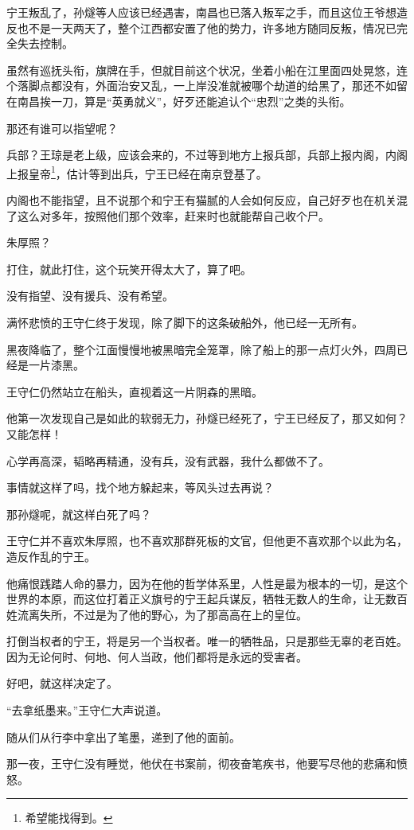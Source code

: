 \begin{multicols}{\theparacolNo}
		宁王叛乱了，孙燧等人应该已经遇害，南昌也已落入叛军之手，而且这位王爷想造反也不是一天两天了，整个江西都安置了他的势力，许多地方随同反叛，情况已完全失去控制。

		虽然有巡抚头衔，旗牌在手，但就目前这个状况，坐着小船在江里面四处晃悠，连个落脚点都没有，外面治安又乱，一上岸没准就被哪个劫道的给黑了，那还不如留在南昌挨一刀，算是“英勇就义”，好歹还能追认个“忠烈”之类的头衔。

		那还有谁可以指望呢？

		兵部？王琼是老上级，应该会来的，不过等到地方上报兵部，兵部上报内阁，内阁上报皇帝\footnote{希望能找得到。}，估计等到出兵，宁王已经在南京登基了。

		内阁也不能指望，且不说那个和宁王有猫腻的人会如何反应，自己好歹也在机关混了这么对多年，按照他们那个效率，赶来时也就能帮自己收个尸。

		朱厚照？

		打住，就此打住，这个玩笑开得太大了，算了吧。

		没有指望、没有援兵、没有希望。

		满怀悲愤的王守仁终于发现，除了脚下的这条破船外，他已经一无所有。

		黑夜降临了，整个江面慢慢地被黑暗完全笼罩，除了船上的那一点灯火外，四周已经是一片漆黑。

		王守仁仍然站立在船头，直视着这一片阴森的黑暗。

		他第一次发现自己是如此的软弱无力，孙燧已经死了，宁王已经反了，那又如何？又能怎样！

		心学再高深，韬略再精通，没有兵，没有武器，我什么都做不了。

		事情就这样了吗，找个地方躲起来，等风头过去再说？

		那孙燧呢，就这样白死了吗？

		王守仁并不喜欢朱厚照，也不喜欢那群死板的文官，但他更不喜欢那个以此为名，造反作乱的宁王。

		他痛恨践踏人命的暴力，因为在他的哲学体系里，人性是最为根本的一切，是这个世界的本原，而这位打着正义旗号的宁王起兵谋反，牺牲无数人的生命，让无数百姓流离失所，不过是为了他的野心，为了那高高在上的皇位。

		打倒当权者的宁王，将是另一个当权者。唯一的牺牲品，只是那些无辜的老百姓。因为无论何时、何地、何人当政，他们都将是永远的受害者。

		好吧，就这样决定了。

		“去拿纸墨来。”王守仁大声说道。

		随从们从行李中拿出了笔墨，递到了他的面前。

		那一夜，王守仁没有睡觉，他伏在书案前，彻夜奋笔疾书，他要写尽他的悲痛和愤怒。


\end{multicols}
